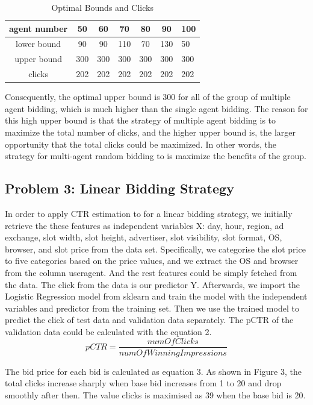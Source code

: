 \documentclass{sig-alternate-05-2015}
\begin{document}
\begin{table}
\centering
\caption{Optimal Bounds and Clicks}
\begin{tabular}{|c|c|c|c|c|c|l|} \hline
agent number&50&60&70&80&90&100\\ \hline
lower bound&90&90&110&70&130&50\\ \hline
upper bound&300&300&300&300&300&300\\ \hline
clicks&202& 202&202&202&202&202\\
\hline\end{tabular}
\end{table}

Consequently, the optimal upper bound is 300 for all of the group of multiple agent bidding, which is much higher than the single agent bidding. The reason for this high upper bound is that the strategy of multiple agent bidding is to maximize the total number of clicks, and the higher upper bound is, the larger opportunity that the total clicks could be maximized. In other words, the strategy for multi-agent random bidding to is maximize the benefits of the group.

\subsection{Problem 3: Linear Bidding Strategy}
In order to apply CTR estimation to for a linear bidding strategy, we initially retrieve the these features as independent variables X: day, hour, region, ad exchange, slot width, slot height, advertiser, slot visibility, slot format, OS, browser, and slot price from the data set. Specifically, we categorise the slot price to five categories based on the price values, and we extract the OS and browser from the column useragent. And the rest features could be simply fetched from the data. The click from the data is our predictor Y.
Afterwards, we import the Logistic Regression model from sklearn and train the model with the independent variables and predictor from the training set. Then we use the trained model to predict the click of test data and validation data separately. The pCTR of the validation data could be calculated with the equation 2.
\begin{equation}pCTR=\frac{numOfClicks}{numOfWinningImpressions}\end{equation}

The bid price for each bid is calculated as equation 3. As shown in Figure 3, the total clicks increase sharply when base bid increases from 1 to 20 and drop smoothly after then. The value clicks is maximised as 39 when the base bid is 20.
\end{document}
